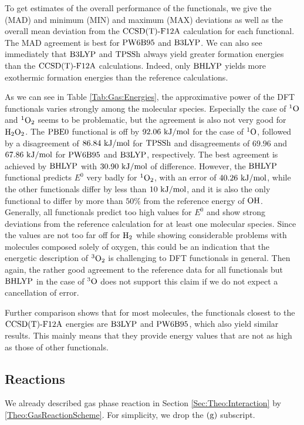 \documentclass[8.5pt,twoside,twocolumn]{article}
\newcommand\singo{\enmat{{^1\te{O}}}}
\newcommand\tripo{\enmat{{^3\te{O}}}}
\newcommand\singot{\enmat{{^1\ot}}}
\newcommand\tripot{\enmat{{^3\ot}}}
\newcommand\kmo{\enmat{\te {kJ/mol}}}
\theoremstyle{standard}
\begin{document}
To get estimates of the overall performance of the functionals,
we give the  (MAD) and minimum (MIN)
and maximum (MAX) deviations as well as the overall mean deviation
from the $\text{CCSD(T)-F12A}$ calculation for each functional. The MAD agreement is
best for $\text{PW6B95}$ and $\text{B3LYP}$. We can also see immediately
that $\text{B3LYP}$ and $\text{TPSSh}$ always yield greater formation energies
than the $\text{CCSD(T)-F12A}$ calculations. Indeed, only $\text{BHLYP}$ yields 
more exothermic formation energies than the reference calculations.

As we can see in Table \ref{Tab:Gas:Energies}, the approximative power
of the DFT functionals varies strongly among the molecular species.
Especially the case of $\singo$ and $\singot$ seems to be problematic, but
the agreement is also not very good for $\text H _2 \text O_2$. The $\text{PBE0}$ functional
is off by $92.06~\kmo$ for the case of $\singo$, followed
by a disagreement of $86.84~\kmo$ for $\text{TPSSh}$ and disagreements
of $69.96$ and $67.86~\kmo$ for $\text{PW6B95}$ and $\text{B3LYP}$, respectively.
The best agreement is achieved by $\text{BHLYP}$ with $30.90~\kmo$ of
difference. However, the $\text{BHLYP}$ functional predicts 
$E^0$ very badly for $\singot$, with an error of $40.26~\kmo$,
while the other functionals differ by less than $10~\kmo$, and it is also
the only functional to differ by more than $50\%$ from the reference energy
of $\text O \text H$. Generally, all functionals predict too high values for $E^0$
and show strong deviations from the reference calculation for at least one
molecular species.
Since the values are not too far off for $\text H_2$ while showing
considerable problems with molecules composed solely of oxygen,
this could be an indication that the energetic description of $\tripot$
is challenging to DFT functionals in general. Then again, the rather good
agreement to the reference data for all functionals but $\text{BHLYP}$ in the case
of $\tripo$ does not support this claim if we do not expect
a cancellation of error. 

Further comparison shows that for most molecules, the functionals
closest to the $\text{CCSD(T)-F12A}$ energies are $\text{B3LYP}$ and $\text{PW6B95}$, which
also yield similar results. This mainly means that they provide
energy values that are not as high as those of other functionals. 

\subsection{Reactions}
\label{Sec:Gas:Reaction}
We already described gas phase reaction in Section \ref{Sec:Theo:Interaction} by 
\eqref{Theo:GasReactionScheme}. For simplicity, we drop the $(\text g)$ subscript.
\end{document}
